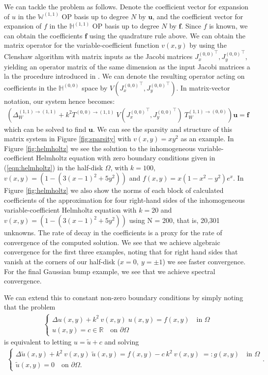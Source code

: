 \documentclass[11pt, oneside]{article}   	%
\newcommand{\R}{\mathbb{R}}
\newcommand{\hdop}{H}
\newcommand{\bighdopii}{{\mathbb{\hdop}^{(1,1)}}}
\newcommand{\bighdopoo}{{\mathbb{\hdop}^{(0,0)}}}
\newcommand{\laplacewii}{\Delta_W^{(1,1)\to(1,1)}}
\newcommand{\bigWii}{{\mathbb{W}^{(1,1)}}}
\begin{document}
We can tackle the problem as follows. Denote the coefficient vector for expansion of $u$ in the $\bigWii$ OP basis up to degree $N$ by $\mathbf{u}$, and the coefficient vector for expansion of $f$ in the $\bighdopii$ OP basis up to degree $N$ by $\mathbf{f}$. Since $f$ is known, we can obtain  the coefficients $\mathbf{f}$ using the quadrature rule above. We can obtain the matrix operator for the variable-coefficient function $v(x,y)$ by using the Clenshaw algorithm with matrix inputs as the Jacobi matrices ${J_x^{(0,0)}}^\top, {J_y^{(0,0)}}^\top$, yielding an operator matrix of the same dimension as the input Jacobi matrices a la the procedure introduced in \cite{olver2019triangle}. We can denote the resulting operator acting on coefficients in the $\bighdopoo$ space by $V({J_x^{(0,0)}}^\top, {J_y^{(0,0)}}^\top)$. In matrix-vector notation, our system hence becomes:
\begin{align*}
    (\laplacewii + k^2 T^{(0,0)\to(1,1)} \: V({J_x^{(0,0)}}^\top, {J_y^{(0,0)}}^\top) \: T_W^{(1,1)\to(0,0)}) \mathbf{u} = \mathbf{f}
\end{align*}
which can be solved to find $\mathbf{u}$. We can see the sparsity and structure of this matrix system in Figure \ref{fig:sparsity} with $v(x,y) = xy^2$ as an example. In Figure \ref{fig:helmholtz} we see the solution to the inhomogeneous variable-coefficient Helmholtz equation with zero boundary conditions given in (\ref{eqn:helmholtz}) in the half-disk $\Omega$, with $k=100$, $v(x,y) = (1 - (3(x-1)^2 + 5y^2))$ and $f(x,y) = x(1-x^2-y^2)e^x$. In Figure \ref{fig:helmholtz} we also show the norms of each block of calculated coefficients of the approximation for four right-hand sides of the inhomogeneous variable-coefficient Helmholtz equation with $k=20$ and $v(x,y) = (1 - (3(x-1)^2 + 5y^2))$ using N = 200, that is, 20,301 unknowns. The rate of decay in the coefficients is a proxy for the rate of convergence of the computed solution. We see that we achieve algebraic convergence for the first three examples, noting that for right hand sides that vanish at the corners of our half-disk ($x=0, \: y = \pm 1$) we see faster convergence. For the final Gaussian bump example, we see that we achieve spectral convergence.

We can extend this to constant non-zero boundary conditions by simply noting that the problem 
\begin{align*}
	\begin{cases}
    		\Delta u(x,y) + k^2 \: v(x,y) \; u(x,y) = f(x,y) \quad \text{in } \Omega \\
		u(x,y) = c \in \R \quad \text{on } \partial \Omega
	\end{cases}
\end{align*}
is equivalent to letting $u = \tilde{u} + c$ and solving
\begin{align*}
	\begin{cases}
    		\Delta \tilde{u}(x,y) + k^2 \: v(x,y) \; \tilde{u}(x,y) = f(x,y) - c \: k^2 \: v(x,y) \; =: g(x,y)  \quad \text{in } \Omega \\
		\tilde{u}(x,y) = 0 \quad \text{on } \partial \Omega.
	\end{cases}.
\end{align*}
\end{document}
